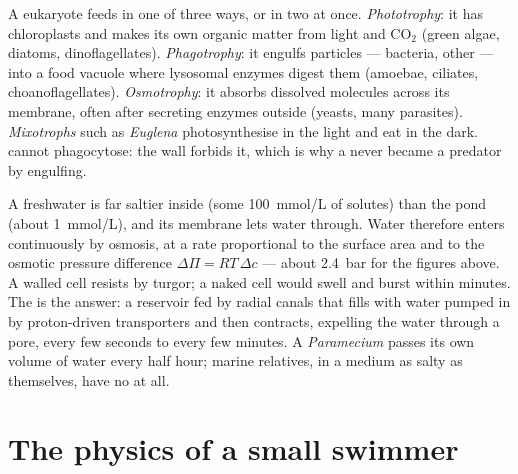 \begin{definition}\label{def:b2:unicellular-diversity:nutrition}
A  eukaryote feeds in one of three ways, or in two at
once. \emph{Phototrophy}: it has chloroplasts and makes its own
organic matter from light and $\mathrm{CO_2}$ (green algae, diatoms,
dinoflagellates). \emph{Phagotrophy}: it engulfs particles ---
bacteria, other  --- into a food vacuole where lysosomal
enzymes digest them (amoebae, ciliates, choanoflagellates).
\emph{Osmotrophy}: it absorbs dissolved molecules across its
membrane, often after secreting enzymes outside (yeasts, many
parasites). \emph{Mixotrophs} such as \emph{Euglena} photosynthesise
in the light and eat in the dark.  cannot phagocytose: the
wall forbids it, which is why a  never became a predator
by engulfing.
\end{definition}

\begin{proposition}\label{prop:b2:unicellular-diversity:osmoregulation}
A freshwater  is far saltier inside (some \qty{100}{mmol/L}
of solutes) than the pond (about \qty{1}{mmol/L}), and its membrane
lets water through. Water therefore enters continuously by osmosis,
at a rate proportional to the surface area and to the osmotic
pressure difference $\Delta\Pi = RT\,\Delta c$ --- about
\qty{2.4}{bar} for the figures above. A walled cell resists by
turgor; a naked cell would swell and burst within minutes. The
\emph{} is the answer: a reservoir fed by radial
canals that fills with water pumped in by proton-driven transporters
and then contracts, expelling the water through a pore, every few
seconds to every few minutes. A \emph{Paramecium} passes its own
volume of water every half hour; marine relatives, in a medium as
salty as themselves, have no  at all.
\end{proposition}

\section{The physics of a small swimmer}

